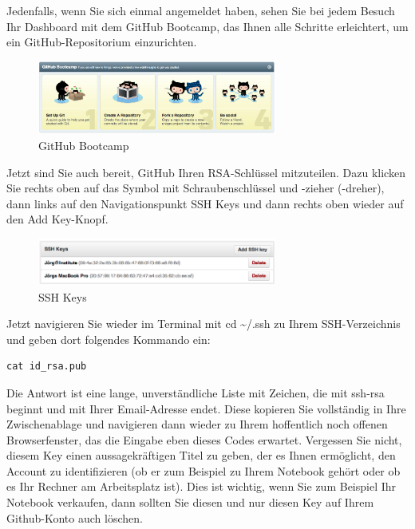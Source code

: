 \documentclass[11pt]{report}
\begin{document}
Jedenfalls, wenn Sie sich einmal angemeldet haben, sehen Sie bei jedem
Besuch Ihr Dashboard mit dem GitHub Bootcamp, das Ihnen alle Schritte
erleichtert, um ein GitHub-Repositorium einzurichten.

\begin{figure}[h!]
\centering
\includegraphics[width=0.7\textwidth]{./images/github-bootscamp.png}
\caption{\label{github-bootscamp}GitHub Bootcamp}
\end{figure}

Jetzt sind Sie auch bereit, GitHub Ihren RSA-Schlüssel
mitzuteilen. Dazu klicken Sie rechts oben auf das Symbol mit
Schraubenschlüssel und -zieher (-dreher), dann links auf den
Navigationspunkt SSH Keys und dann rechts oben wieder auf den Add
Key-Knopf.

\begin{figure}[h!]
\centering
\includegraphics[width=0.7\textwidth]{./images/ssh-keys.png}
\caption{\label{ssh-keys}SSH Keys}
\end{figure}

Jetzt navigieren Sie wieder im Terminal mit cd \~{}/.ssh zu Ihrem
SSH-Verzeichnis und geben dort folgendes Kommando ein:


\begin{verbatim}
cat id_rsa.pub
\end{verbatim}

Die Antwort ist eine lange, unverständliche Liste mit Zeichen, die mit
ssh-rsa beginnt und mit Ihrer Email-Adresse endet. Diese kopieren Sie
vollständig in Ihre Zwischenablage und navigieren dann wieder zu Ihrem
hoffentlich noch offenen Browserfenster, das die Eingabe eben dieses
Codes erwartet. Vergessen Sie nicht, diesem Key einen aussagekräftigen
Titel zu geben, der es Ihnen ermöglicht, den Account zu identifizieren
(ob er zum Beispiel zu Ihrem Notebook gehört oder ob es Ihr Rechner am
Arbeitsplatz ist). Dies ist wichtig, wenn Sie zum Beispiel Ihr
Notebook verkaufen, dann sollten Sie diesen und nur diesen Key auf
Ihrem Github-Konto auch löschen.
\end{document}
